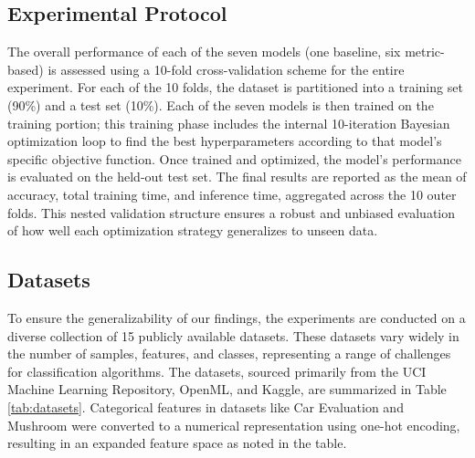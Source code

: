 \documentclass[conference]{IEEEtran}
\begin{document}
\subsection{Experimental Protocol}
The overall performance of each of the seven models (one baseline, six metric-based) is assessed using a 10-fold cross-validation scheme for the entire experiment. For each of the 10 folds, the dataset is partitioned into a training set (90\%) and a test set (10\%). Each of the seven models is then trained on the training portion; this training phase includes the internal 10-iteration Bayesian optimization loop to find the best hyperparameters according to that model's specific objective function. Once trained and optimized, the model's performance is evaluated on the held-out test set. The final results are reported as the mean of accuracy, total training time, and inference time, aggregated across the 10 outer folds. This nested validation structure ensures a robust and unbiased evaluation of how well each optimization strategy generalizes to unseen data.

\subsection{Datasets}
To ensure the generalizability of our findings, the experiments are conducted on a diverse collection of 15 publicly available datasets. These datasets vary widely in the number of samples, features, and classes, representing a range of challenges for classification algorithms. The datasets, sourced primarily from the UCI Machine Learning Repository, OpenML, and Kaggle, are summarized in Table \ref{tab:datasets}. Categorical features in datasets like Car Evaluation and Mushroom were converted to a numerical representation using one-hot encoding, resulting in an expanded feature space as noted in the table.
\end{document}
